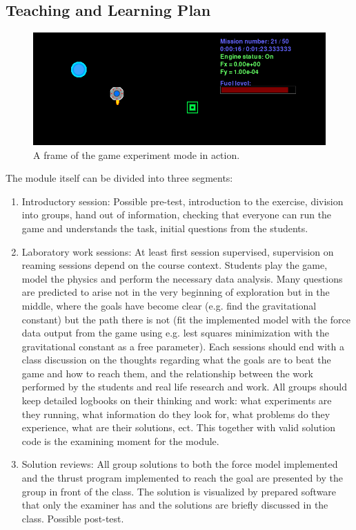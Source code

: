 \documentclass[11pt, twocolumn]{article}
\begin{document}
\subsection{Teaching and Learning Plan}

\begin{figure}
    \centering
    \includegraphics[width=0.9\hsize]{game_frame.png}
    \caption{A frame of the game experiment mode in action.}
    \label{fig:game_frame}
\end{figure}


The module itself can be divided into three segments:
\begin{enumerate}
    \item Introductory session:\newline
    Possible pre-test, introduction to the exercise, division into groups, hand out of information, checking that everyone can run the game and understands the task, initial questions from the students.
    \item Laboratory work sessions:\newline
    At least first session supervised, supervision on reaming sessions depend on the course context. Students play the game, model the physics and perform the necessary data analysis. Many questions are predicted to arise not in the very beginning of exploration but in the middle, where the goals have become clear (e.g. find the gravitational constant) but the path there is not (fit the implemented model with the force data output from the game using e.g. lest squares minimization with the gravitational constant as a free parameter). Each sessions should end with a class discussion on the thoughts regarding what the goals are to beat the game and how to reach them, and the relationship between the work performed by the students and real life research and work. All groups should keep detailed logbooks on their thinking and work: what experiments are they running, what information do they look for, what problems do they experience, what are their solutions, ect. This together with valid solution code is the examining moment for the module.
    \item Solution reviews:\newline
    All group solutions to both the force model implemented and the thrust program implemented to reach the goal are presented by the group in front of the class. The solution is visualized by prepared software that only the examiner has and the solutions are briefly discussed in the class. Possible post-test.
\end{enumerate}
\end{document}

